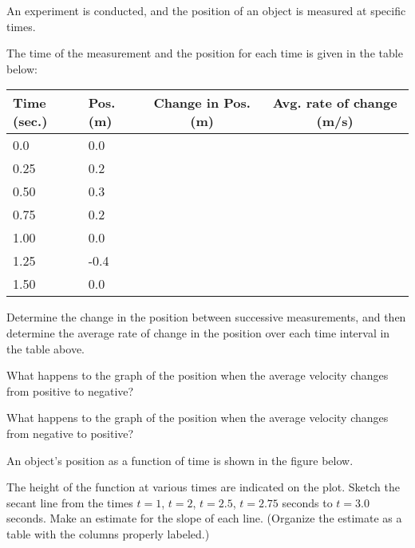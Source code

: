 \begin{problem}
\item An experiment is conducted, and the position of an object is
  measured at specific times. 
  \begin{subproblem}
  \item The time of the measurement and the
    position for each time is given in the table below: \\
  \begin{tabular}{l|l|c|c}
    Time (sec.) & Pos. (m) & Change in Pos. (m) & Avg. rate of change (m/s) \\ \hline
    0.0  &  0.0 & \\ [12pt]
    0.25 &  0.2 & \\ [12pt]
    0.50 &  0.3 & \\ [12pt]
    0.75 &  0.2 & \\ [12pt]
    1.00 &  0.0 & \\ [12pt]
    1.25 & -0.4 & \\ [12pt]
    1.50 &  0.0 &
  \end{tabular}

  Determine the change in the position between successive
  measurements, and then determine the average rate of change in the
  position over each time interval in the table above.

  \item What happens to the graph of the position when the average
    velocity changes from positive to negative?  
    \vfill

  \item What happens to the graph of the position when the average
    velocity changes from negative to positive?
    \vfill

  \end{subproblem}

  \clearpage

  \item An object's position as a function of time is shown in the
    figure below. 

    \scalebox{0.5}{}

    \begin{subproblem}
    \item The height of the function at various times are indicated on
      the plot. Sketch the secant line from the times $t=1$, $t=2$,
      $t=2.5$, $t=2.75$ seconds to $t=3.0$ seconds. Make an estimate
      for the slope of each line. (Organize the estimate as a table
      with the columns properly labeled.)


\end{subproblem}
\end{problem}
